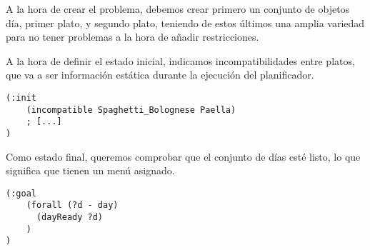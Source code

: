 \documentclass{article}
\begin{document}
A la hora de crear el problema, debemos crear primero un conjunto de objetos día, primer plato, y segundo plato, teniendo de estos últimos una amplia variedad para no tener problemas a la hora de añadir restricciones.
\par
A la hora de definir el estado inicial, indicamos incompatibilidades entre platos, que va a ser información estática durante la ejecución del planificador.
\begin{lstlisting}[language=pddl]
(:init
    (incompatible Spaghetti_Bolognese Paella)
    ; [...]
)
\end{lstlisting}
Como estado final, queremos comprobar que el conjunto de días esté listo, lo que significa que tienen un menú asignado.
\begin{lstlisting}[language=pddl]
(:goal
    (forall (?d - day)
      (dayReady ?d)
    )
)
\end{lstlisting}
\end{document}
